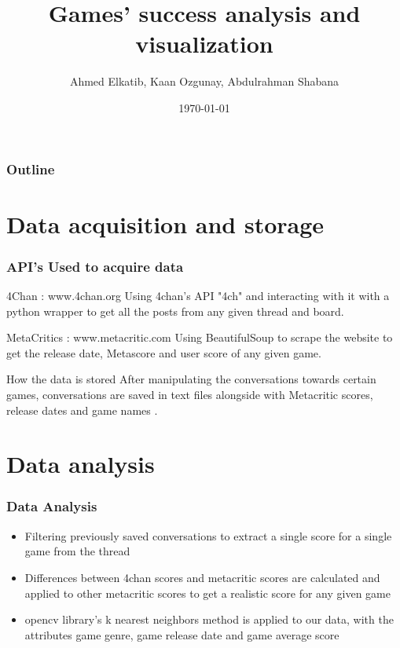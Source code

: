 \documentclass{beamer}
\title[Video games' success]{Games' success analysis and visualization}
\author{Ahmed Elkatib, Kaan Ozgunay, Abdulrahman Shabana}
\institute[CSULA] 
{
California State University Los Angeles \\ 

\medskip

}
\date{\today}
\begin{document}
\begin{frame}
\titlepage 
\end{frame}

\begin{frame}
\frametitle{Outline} 

\tableofcontents 

\end{frame}



\section{Data acquisition and storage} 

\begin{frame}
\frametitle{API's Used to acquire data}
\begin{block}{4Chan :  www.4chan.org }
Using 4chan's API "4ch" and interacting with it with a python wrapper to get all the posts from any given thread and board.
\end{block}

\begin{block}{MetaCritics :  www.metacritic.com}
Using BeautifulSoup to scrape the website to get the release date, Metascore and user score of any given game.
\end{block}

\begin{block}{How the data is stored}
After  manipulating the conversations towards certain games, conversations are saved in text files alongside with Metacritic scores, release dates and game names .
\end{block}
\end{frame}



\section{Data analysis}

\begin{frame}
\frametitle{Data Analysis}
\begin {itemize}

\item Filtering previously saved conversations to extract a single score for a single game from the thread

\item Differences between 4chan scores and metacritic scores are calculated and applied to other metacritic scores to get a realistic score for any given game

\item opencv library's k nearest neighbors method is applied to our data, with the attributes game genre, game release date and game average score




\end {itemize}

\end {frame}
\end{document}
